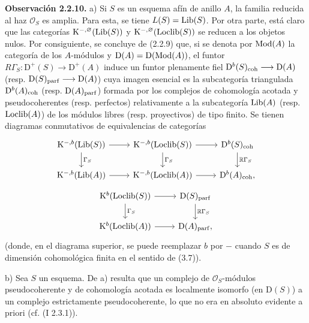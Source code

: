 \textbf{Observación 2.2.10.} a) Si $S$ es un esquema afín de anillo $A$, la familia reducida al haz $\mathcal O_S$ es amplia. Para esta, se tiene $L(S)=\operatorname{Lib}(S)$. Por otra parte, está claro que las categorías $\mathrm K^{-,\varnothing}(\operatorname{Lib}(S))$ y $\mathrm K^{-,\varnothing}(\operatorname{Loclib}(S))$ se reducen a los objetos nulos. Por consiguiente, se concluye de (2.2.9) que, si se denota por $\operatorname{Mod}(A)$ la categoría de los $A$-módulos y $\mathrm D(A)=\mathrm D(\operatorname{Mod}(A))$, el funtor $R\Gamma_S:\mathrm D^+(S)\longrightarrow\mathrm D^+(A)$ induce un funtor plenamente fiel $\mathrm D^b(S)_{\mathrm{coh}}\longrightarrow\mathrm D(A)$ (resp. $\mathrm D(S)_{\mathrm{parf}}\longrightarrow\mathrm D(A)$) cuya imagen esencial es la subcategoría triangulada $\mathrm D^b(A)_{\mathrm{coh}}$ (resp. $\mathrm D(A)_{\mathrm{parf}}$) formada por los complejos de cohomología acotada y pseudocoherentes (resp. perfectos) relativamente a la subcategoría $\operatorname{Lib}(A)$ (resp. $\operatorname{Loclib}(A)$) de los módulos libres (resp. proyectivos) de tipo finito. Se tienen diagramas conmutativos de equivalencias de categorías
\[
\begin{tikzcd}
\mathrm K^{-,b}(\Lib(S)) \arrow[r] \arrow[d,"\Gamma_S"] &
\mathrm K^{-,b}(\Loclib(S)) \arrow[r] \arrow[d,"\Gamma_S"] &
\mathrm D^b(S)_{\coh} \arrow[d,"\mathbb R\Gamma_S"] \\
\mathrm K^{-,b}(\Lib(A)) \arrow[r] &
\mathrm K^{-,b}(\Loclib(A)) \arrow[r] &
\mathrm D^b(A)_{\coh},
\end{tikzcd}
\]
\[
\begin{tikzcd}
\mathrm K^b(\Loclib(S)) \arrow[r] \arrow[d,"\Gamma_S"] &
\mathrm D(S)_{\parf} \arrow[d,"\mathbb R\Gamma_S"] \\
\mathrm K^b(\Loclib(A)) \arrow[r] &
\mathrm D(A)_{\parf},
\end{tikzcd}
\]
(donde, en el diagrama superior, se puede reemplazar $b$ por $-$ cuando $S$ es de dimensión cohomológica finita en el sentido de (3.7)).

b) Sea $S$ un esquema. De a) resulta que un complejo de $\mathcal O_S$-módulos pseudocoherente y de cohomología acotada es localmente isomorfo (en $\mathrm D(S)$) a un complejo estrictamente pseudocoherente, lo que no era en absoluto evidente a priori (cf. (I 2.3.1)).

